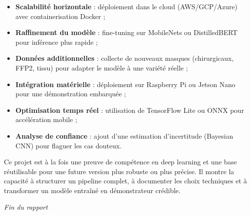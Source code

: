 \documentclass[11pt,a4paper]{article}
\begin{document}
\begin{itemize}
    \item \textbf{Scalabilité horizontale} : déploiement dans le cloud (AWS/GCP/Azure) avec containerisation Docker ;
    \item \textbf{Raffinement du modèle} : fine-tuning sur MobileNets ou DistilledBERT pour inférence plus rapide ;
    \item \textbf{Données additionnelles} : collecte de nouveaux masques (chirurgicaux, FFP2, tissu) pour adapter le modèle à une variété réelle ;
    \item \textbf{Intégration matérielle} : déploiement sur Raspberry Pi ou Jetson Nano pour une démonstration embarquée ;
    \item \textbf{Optimisation temps réel} : utilisation de TensorFlow Lite ou ONNX pour accélération mobile ;
    \item \textbf{Analyse de confiance} : ajout d'une estimation d'incertitude (Bayesian CNN) pour flaguer les cas douteux.
\end{itemize}

Ce projet est à la fois une preuve de compétence en deep learning et une base réutilisable pour une future version plus robuste ou plus précise. Il montre la capacité à structurer un pipeline complet, à documenter les choix techniques et à transformer un modèle entraîné en démonstrateur crédible.

\vfill

\begin{center}
\textit{Fin du rapport}
\end{center}
\end{document}
